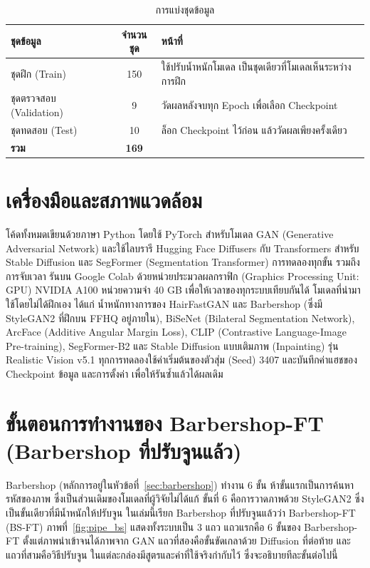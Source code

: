 \begin{table}[!htbp]
\centering
\caption{การแบ่งชุดข้อมูล}
\label{tab:dataset}
\begin{tabular}{|L{3.8cm}|c|L{8.2cm}|}
\hline
\textbf{ชุดข้อมูล} & \textbf{จำนวนชุด} & \textbf{หน้าที่} \\ \hline
ชุดฝึก (Train) & 150 & ใช้ปรับน้ำหนักโมเดล เป็นชุดเดียวที่โมเดลเห็นระหว่างการฝึก \\ \hline
ชุดตรวจสอบ (Validation) & 9 & วัดผลหลังจบทุก Epoch เพื่อเลือก Checkpoint \\ \hline
ชุดทดสอบ (Test) & 10 & ล็อก Checkpoint ไว้ก่อน แล้ววัดผลเพียงครั้งเดียว \\ \hline
\textbf{รวม} & \textbf{169} & \\ \hline
\end{tabular}
\end{table}

\section{เครื่องมือและสภาพแวดล้อม}

โค้ดทั้งหมดเขียนด้วยภาษา Python โดยใช้ PyTorch สำหรับโมเดล GAN (Generative Adversarial Network)
และใช้ไลบรารี Hugging Face Diffusers กับ Transformers สำหรับ Stable Diffusion และ SegFormer (Segmentation Transformer)
การทดลองทุกขั้น รวมถึงการจับเวลา รันบน Google Colab ด้วยหน่วยประมวลผลกราฟิก (Graphics Processing Unit: GPU)
NVIDIA A100 หน่วยความจำ 40 GB เพื่อให้เวลาของทุกระบบเทียบกันได้
โมเดลที่นำมาใช้โดยไม่ได้ฝึกเอง ได้แก่ น้ำหนักทางการของ HairFastGAN และ Barbershop
(ซึ่งมี StyleGAN2 ที่ฝึกบน FFHQ อยู่ภายใน), BiSeNet (Bilateral Segmentation Network), ArcFace (Additive Angular Margin Loss),
CLIP (Contrastive Language-Image Pre-training), SegFormer-B2
และ Stable Diffusion แบบเติมภาพ (Inpainting) รุ่น Realistic Vision v5.1
ทุกการทดลองใช้ค่าเริ่มต้นของตัวสุ่ม (Seed) 3407 และบันทึกค่าแฮชของ Checkpoint ข้อมูล และการตั้งค่า
เพื่อให้รันซ้ำแล้วได้ผลเดิม

\section{ขั้นตอนการทำงานของ Barbershop-FT (Barbershop ที่ปรับจูนแล้ว)}
\label{sec:pipe_bs}

Barbershop (หลักการอยู่ในหัวข้อที่~\ref{sec:barbershop}) ทำงาน 6 ขั้น
ห้าขั้นแรกเป็นการค้นหารหัสของภาพ ซึ่งเป็นส่วนเดิมของโมเดลที่ผู้วิจัยไม่ได้แก้
ขั้นที่ 6 คือการวาดภาพด้วย StyleGAN2 ซึ่งเป็นขั้นเดียวที่มีน้ำหนักให้ปรับจูน
ในเล่มนี้เรียก Barbershop ที่ปรับจูนแล้วว่า Barbershop-FT (BS-FT)
ภาพที่~\ref{fig:pipe_bs} แสดงทั้งระบบเป็น 3 แถว แถวแรกคือ 6 ขั้นของ Barbershop-FT
ตั้งแต่ภาพนำเข้าจนได้ภาพจาก GAN แถวที่สองคือขั้นขัดเกลาด้วย Diffusion ที่ต่อท้าย
และแถวที่สามคือวิธีปรับจูน ในแต่ละกล่องมีสูตรและค่าที่ใช้จริงกำกับไว้
ซึ่งจะอธิบายทีละขั้นต่อไปนี้

